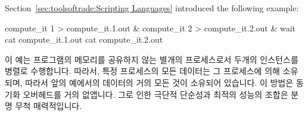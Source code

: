 Section~\ref{sec:toolsoftrade:Scripting Languages}
introduced the following example:

\fi

\begin{VerbatimN}[samepage=true]
compute_it 1 > compute_it.1.out &
compute_it 2 > compute_it.2.out &
wait
cat compute_it.1.out
cat compute_it.2.out
\end{VerbatimN}

이 예는  프로그램의 메모리를 공유하지 않는 별개의 프로세스로서
두개의 인스턴스를 병렬로 수행합니다.
따라서, 특정 프로세스의 모든 데이터는 그 프로세스에 의해 소유되며, 따라서 앞의
예에서의 데이터의 거의 모든 것이 소유되어 있습니다.
이 방법은 동기화 오버헤드를 거의 없앱니다.
그로 인한 극단적 단순성과 최적의 성능의 조합은 분명 무척 매력적입니다.

\iffalse

This example runs two instances of the \co{compute_it} program in
parallel, as separate processes that do not share memory.
Therefore, all data in a given process is owned by that process,
so that almost the entirety of data in the above example is owned.
This approach almost entirely eliminates synchronization overhead.
The resulting combination of extreme simplicity and optimal performance
is obviously quite attractive.

\fi

